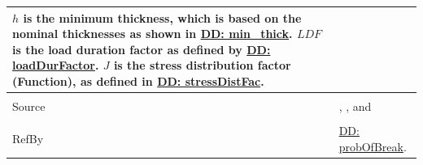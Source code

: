 \documentclass[12pt]{article}
\begin{document}
\begin{minipage}{\textwidth}
\begin{tabular}{p{} p{}}
        $h$ is the minimum thickness, which is based on the nominal thicknesses as shown in \hyperref[DD:min.thick]{DD: min\_thick}.
        $LDF$ is the load duration factor as defined by \hyperref[DD:loadDurFactor]{DD: loadDurFactor}.
        $J$ is the stress distribution factor (Function), as defined in \hyperref[DD:stressDistFac]{DD: stressDistFac}.
\\ \midrule \\
Source & \cite{astm2009}, \cite{beasonEtAl1998}, and \cite{campidelli}
\\ \midrule \\
RefBy & \hyperref[DD:probOfBreak]{DD: probOfBreak}.
\\ \bottomrule \end{tabular}
\end{minipage}\\
~\newline
\end{document}

